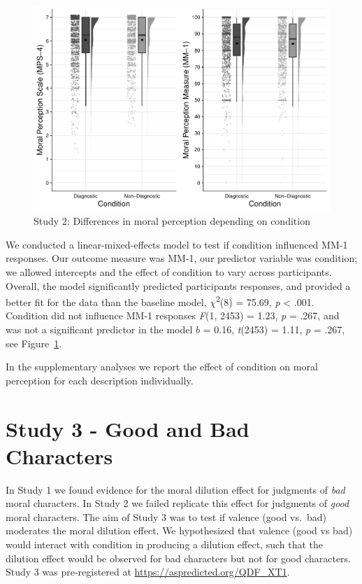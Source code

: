 \documentclass[
  man,floatsintext]{apa6}
\begin{document}
\begin{figure}
\centering
\includegraphics{moral_dilution_in_chunks_files/figure-latex/S2bothconditionplot-1.pdf}
\caption{\label{fig:S2bothconditionplot}Study 2: Differences in moral perception depending on condition}
\end{figure}

We conducted a linear-mixed-effects model to test if condition influenced MM-1 responses. Our outcome measure was MM-1, our predictor variable was condition; we allowed intercepts and the effect of condition to vary across participants. Overall, the model significantly predicted participants responses, and provided a better fit for the data than the baseline model, \(\chi\)\textsuperscript{2}(8) = 75.69, \emph{p} \textless{} .001. Condition did not influence MM-1 responses \emph{F}(1, 2453) = 1.23, \emph{p} = .267, and was not a significant predictor in the model \(b\) = 0.16, \emph{t}(2453) = 1.11, \emph{p} = .267, see Figure~\ref{fig:S2bothconditionplot}.

In the supplementary analyses we report the effect of condition on moral perception for each description individually.

\section{Study 3 - Good and Bad Characters}\label{study-3---good-and-bad-characters}

In Study 1 we found evidence for the moral dilution effect for judgments of \emph{bad} moral characters. In Study 2 we failed replicate this effect for judgments of \emph{good} moral characters. The aim of Study 3 was to test if valence (good vs.~bad) moderates the moral dilution effect. We hypothesized that valence (good vs bad) would interact with condition in producing a dilution effect, such that the dilution effect would be observed for bad characters but not for good characters. Study 3 was pre-registered at \color{blue}\url{https://aspredicted.org/QDF_XT1}\color{black}.
\end{document}
